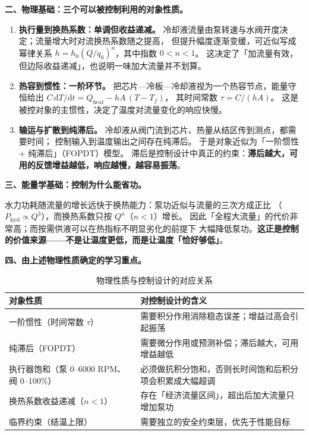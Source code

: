 \documentclass[stage1,fontset=fandol]{ydzjreport}
\begin{document}
	\textbf{二、物理基础：三个可以被控制利用的对象性质。}
	
	\begin{enumerate}
		\item \textbf{执行量到换热系数：单调但收益递减。}
		冷却液流量由泵转速与水阀开度决定；流量增大时对流换热系数随之提高，
		但提升幅度逐渐变缓，可近似写成幂律关系
		$h = h_0 (Q/q_0)^n$，其中指数 $0<n<1$。
		这决定了「加流量有效，但边际收益递减」，也说明一味加大流量并不划算。
		
		\item \textbf{热容到惯性：一阶环节。}
		把芯片—冷板—冷却液视为一个热容节点，能量守恒给出
		$C\,\mathrm{d}T/\mathrm{d}t = Q_{\mathrm{heat}} - hA\,(T - T_f)$，
		其时间常数 $\tau = C/(hA)$。
		这是被控对象的主惯性，决定了温度对流量变化的响应快慢。
		
		\item \textbf{输运与扩散到纯滞后。}
		冷却液从阀门流到芯片、热量从结区传到测点，都需要时间；
		控制输入到温度输出之间存在纯滞后。
		于是对象近似为「一阶惯性 + 纯滞后」（FOPDT）模型。
		滞后是控制设计中真正的约束：\textbf{滞后越大，可用的反馈增益越低，响应越慢，越容易振荡}。
	\end{enumerate}
	
	\textbf{三、能量学基础：控制为什么能省功。}
	
	水力功耗随流量的增长远快于换热能力：泵功近似与流量的三次方成正比
	（$P_{\mathrm{hyd}} \propto Q^3$），而换热系数只按 $Q^n$（$n<1$）增长。
	因此「全程大流量」的代价非常高；而按需供液可以在热指标不明显劣化的前提下
	大幅降低泵功。\textbf{这正是控制的价值来源——不是让温度更低，而是让温度「恰好够低」}。
	
	\textbf{四、由上述物理性质确定的学习重点。}
	
	\begin{table}[H]
		\centering
		\caption{物理性质与控制设计的对应关系}
		\label{tab:physics-control}
		\begin{tabularx}{\textwidth}{@{}Y Y@{}}
			\toprule
			 对象性质 & 对控制设计的含义 \\
			\midrule
			一阶惯性（时间常数 $\tau$） & 需要积分作用消除稳态误差；增益过高会引起振荡 \\
			纯滞后（FOPDT） & 需要微分作用或预测补偿；滞后越大，可用增益越低 \\
			执行器饱和（泵 $0$--$6000$ RPM、阀 $0$--$100\%$） & 必须做抗积分饱和，否则长时间饱和后积分项会积累成大幅超调 \\
			换热系数收益递减（$n<1$） & 存在「经济流量区间」，超出后加大流量只增加泵功 \\
			临界约束（结温上限） & 需要独立的安全约束层，优先于性能目标 \\
			\bottomrule
		\end{tabularx}
	\end{table}
	
\end{document}
